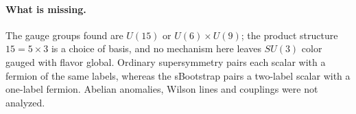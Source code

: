 \paragraph{What is missing.}
The gauge groups found are $U(15)$ or $U(6)\times U(9)$; the product
structure $15=5\times3$ is a choice of basis, and no mechanism here
leaves $SU(3)$ color gauged with flavor global. Ordinary supersymmetry
pairs each scalar with a fermion of the same labels, whereas the
sBootstrap pairs a two-label scalar with a one-label fermion. Abelian
anomalies, Wilson lines and couplings were not analyzed.
